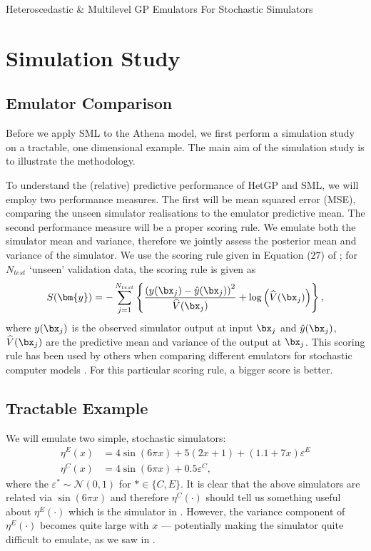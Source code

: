 \begin{chapter}{Heteroscedastic \& Multilevel GP Emulators For Stochastic Simulators\label{Ch:Hetsml}}
\section{Simulation Study\label{Sec:simulation-studies}}
\subsection{ Emulator Comparison \label{Sec:testing-method}}

Before we apply SML to the Athena model, we first perform a simulation study on a tractable, one dimensional example. The main aim of the simulation study is to illustrate the methodology.

To understand the (relative) predictive performance of HetGP and SML, we will employ two performance measures. The first will be mean squared error (MSE), comparing the unseen simulator realisations to the emulator predictive mean. The second performance measure will be a proper scoring rule. We emulate both the simulator mean and variance, therefore we jointly assess the posterior mean and variance of the simulator. We use the scoring rule given in Equation ($27$) of \cite{Gneiting2007}; for $N_{test}$ `unseen' validation data, the scoring rule is given as
\begin{equation*}
	S(\bm{y}) =  -\sum_{j = 1}^{N_{test}} \left\{  \frac{\left( y(\bx_j) - \hat{y}(\bx_j) \right)^2}{\widehat{V}(\bx_j)}  + \log \left( \widehat{V}(\bx_j) \right) \right\},
\end{equation*}
\noindent where $y(\bx_j)$ is the observed simulator output at input $\bx_j$ and $\hat{y}(\bx_j)$, $\widehat{V}(\bx_j)$ are the predictive mean and variance of the output at $\bx_j$. This scoring rule has been used by others when comparing different emulators for stochastic computer models \citep{Binois2018, Baker2020a}. For this particular scoring rule, a bigger score is better.

\subsection{Tractable Example}

We will emulate two simple, stochastic simulators:
\begin{align*}
	\eta^E(x) & = 4 \sin(6\pi x) + 5(2x + 1)  + (1.1 + 7x)\varepsilon^E \\
	\eta^C(x) & = 4 \sin(6\pi x) + 0.5\varepsilon^C,
\end{align*}
where the $\varepsilon^{*} \sim \mathcal{N}(0, 1)$ for $* \in \{C, E\}$. It is clear that the above simulators are related via $\sin(6\pi x)$ and therefore $\eta^C(\cdot)$ should tell us something useful about $\eta^E(\cdot)$ which is the simulator in . However, the variance component of $\eta^E(\cdot)$ becomes quite large with $x$ --- potentially making the simulator quite difficult to emulate, as we saw in .


\end{chapter}
